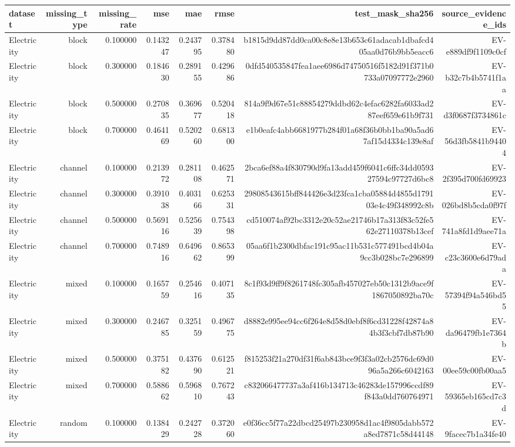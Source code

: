 \begin{tabular}{lrrrrrrr}
\hline
dataset & missing\_type & missing\_rate & mse & mae & rmse & test\_mask\_sha256 & source\_evidence\_ids \\
\hline
Electricity & block & 0.100000 & 0.143247 & 0.243795 & 0.378480 & b1815d9dd87dd0ca00c8e8e13b653c61adacab1dbafcd405aa0d76b9bb5eacc6 & EV-e889df9f1109c0cf \\
Electricity & block & 0.300000 & 0.184630 & 0.289155 & 0.429686 & 0dfd540535847fea1aee6986d74750516f5182d91f371b0733a07097772e2960 & EV-b32c7b4b5741f1aa \\
Electricity & block & 0.500000 & 0.270835 & 0.369677 & 0.520418 & 814a9f9d67e51c88854279ddbd62c4efac6282fa6033ad287eef659e61b9f731 & EV-d3f0687f3734861c \\
Electricity & block & 0.700000 & 0.464169 & 0.520260 & 0.681300 & e1b0eafc4abb6681977b284f01a68f36b0bb1ba90a5ad67af15d4334c139e8af & EV-56d3fb5841b94404 \\
Electricity & channel & 0.100000 & 0.213972 & 0.281108 & 0.462571 & 2bca6ef88a4f830790d9fa13add459f6041c6ffc34dd059327594c97727d6bc8 & EV-2f395d700fd69923 \\
Electricity & channel & 0.300000 & 0.391038 & 0.403166 & 0.625331 & 29808543615bff844426e3d23fca1cba05884d4855d179103e4c49f348992c8b & EV-026bd8b5cda0f97f \\
Electricity & channel & 0.500000 & 0.569116 & 0.525639 & 0.754398 & cd510074af92bc3312e20c52ae21746b17a313f83c52fe562e27110378b13cef & EV-741a8fd1d9aee71a \\
Electricity & channel & 0.700000 & 0.748916 & 0.649662 & 0.865399 & 05aa6f1b2300dbfac191c95ac11b531c577491bcd4b04a9cc3b028bc7e296899 & EV-c23c3600e6d79ada \\
Electricity & mixed & 0.100000 & 0.165759 & 0.254616 & 0.407135 & 8c1f93d9ff9f8261748fc305afb457027eb50c1312b9ace9f1867050892ba70c & EV-57394f94a546bd55 \\
Electricity & mixed & 0.300000 & 0.246785 & 0.325159 & 0.496775 & d8882e995ee94cc6f264e8d58d0ebf8f6cd31228f42874a84b3f3cbf7db87b90 & EV-da96479fb1e7364b \\
Electricity & mixed & 0.500000 & 0.375182 & 0.437690 & 0.612521 & f815253f21a270df31f6ab843bce9f3f3a02cb2576dc69d096a5a266c6042163 & EV-00ee59c00fb00aa5 \\
Electricity & mixed & 0.700000 & 0.588662 & 0.596810 & 0.767243 & c832066477737a3af416b134713c46283de157996ccdf89f843a0dd760764971 & EV-59365eb165cd7c3d \\
Electricity & random & 0.100000 & 0.138429 & 0.242728 & 0.372060 & e0f36cc5f77a22dbcd25497b230958d1ac4f9805dabb572a8ed7871c58d44148 & EV-9facec7b1a34fe40 \\

\end{tabular}
